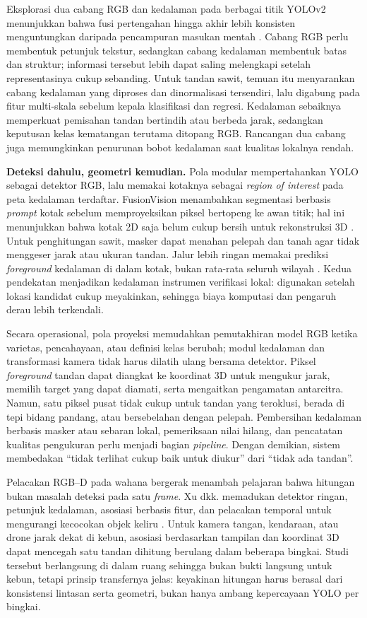 Eksplorasi dua cabang RGB dan kedalaman pada berbagai titik YOLOv2 menunjukkan bahwa fusi pertengahan hingga akhir lebih konsisten menguntungkan daripada pencampuran masukan mentah \cite{ophoff2019multimodal}. Cabang RGB perlu membentuk petunjuk tekstur, sedangkan cabang kedalaman membentuk batas dan struktur; informasi tersebut lebih dapat saling melengkapi setelah representasinya cukup sebanding. Untuk tandan sawit, temuan itu menyarankan cabang kedalaman yang diproses dan dinormalisasi tersendiri, lalu digabung pada fitur multi-skala sebelum kepala klasifikasi dan regresi. Kedalaman sebaiknya memperkuat pemisahan tandan bertindih atau berbeda jarak, sedangkan keputusan kelas kematangan terutama ditopang RGB. Rancangan dua cabang juga memungkinkan penurunan bobot kedalaman saat kualitas lokalnya rendah.

\textbf{Deteksi dahulu, geometri kemudian.} Pola modular mempertahankan YOLO sebagai detektor RGB, lalu memakai kotaknya sebagai \textit{region of interest} pada peta kedalaman terdaftar. FusionVision menambahkan segmentasi berbasis \textit{prompt} kotak sebelum memproyeksikan piksel bertopeng ke awan titik; hal ini menunjukkan bahwa kotak 2D saja belum cukup bersih untuk rekonstruksi 3D \cite{elamraoui2024fusionvision}. Untuk penghitungan sawit, masker dapat menahan pelepah dan tanah agar tidak menggeser jarak atau ukuran tandan. Jalur lebih ringan memakai prediksi \textit{foreground} kedalaman di dalam kotak, bukan rata-rata seluruh wilayah \cite{chen2023depthyolo}. Kedua pendekatan menjadikan kedalaman instrumen verifikasi lokal: digunakan setelah lokasi kandidat cukup meyakinkan, sehingga biaya komputasi dan pengaruh derau lebih terkendali.

Secara operasional, pola proyeksi memudahkan pemutakhiran model RGB ketika varietas, pencahayaan, atau definisi kelas berubah; modul kedalaman dan transformasi kamera tidak harus dilatih ulang bersama detektor. Piksel \textit{foreground} tandan dapat diangkat ke koordinat 3D untuk mengukur jarak, memilih target yang dapat diamati, serta mengaitkan pengamatan antarcitra. Namun, satu piksel pusat tidak cukup untuk tandan yang teroklusi, berada di tepi bidang pandang, atau bersebelahan dengan pelepah. Pembersihan kedalaman berbasis masker atau sebaran lokal, pemeriksaan nilai hilang, dan pencatatan kualitas pengukuran perlu menjadi bagian \textit{pipeline}. Dengan demikian, sistem membedakan ``tidak terlihat cukup baik untuk diukur'' dari ``tidak ada tandan''.

Pelacakan RGB--D pada wahana bergerak menambah pelajaran bahwa hitungan bukan masalah deteksi pada satu \textit{frame}. Xu dkk. memadukan detektor ringan, petunjuk kedalaman, asosiasi berbasis fitur, dan pelacakan temporal untuk mengurangi kecocokan objek keliru \cite{xu2024onboard}. Untuk kamera tangan, kendaraan, atau drone jarak dekat di kebun, asosiasi berdasarkan tampilan dan koordinat 3D dapat mencegah satu tandan dihitung berulang dalam beberapa bingkai. Studi tersebut berlangsung di dalam ruang sehingga bukan bukti langsung untuk kebun, tetapi prinsip transfernya jelas: keyakinan hitungan harus berasal dari konsistensi lintasan serta geometri, bukan hanya ambang kepercayaan YOLO per bingkai.

